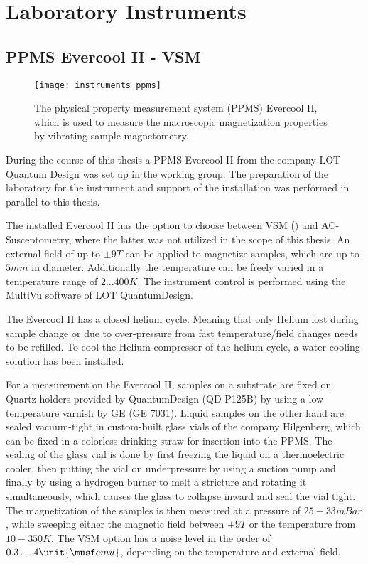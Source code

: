 \documentclass[\main/dresen_thesis.tex]{subfiles}
\begin{document}
\section{Laboratory Instruments}
  \subsection{PPMS Evercool II - VSM}
    \label{ch:instruments:laboratoryInstruments:vsm}
    \begin{figure}[ht]
      \centering
      \texttt{[image: instruments\_ppms]}
      \caption{\label{fig:appendix:instruments:ppms}The physical property measurement system (PPMS) Evercool II, which is used to measure the macroscopic magnetization properties by vibrating sample magnetometry.}
    \end{figure}
    During the course of this thesis a PPMS Evercool II from the company LOT Quantum Design was set up in the working group.
    The preparation of the laboratory for the instrument and support of the installation was performed in parallel to this thesis.

    The installed Evercool II has the option to choose between VSM () and AC-Susceptometry, where the latter was not utilized in the scope of this thesis.
    An external field of up to $\pm 9 \unit{T}$ can be applied to magnetize samples, which are up to $5 \unit{mm}$ in diameter.
    Additionally the temperature can be freely varied in a temperature range of $2 \ldots 400 \unit{K}$.
    The instrument control is performed using the MultiVu software of LOT QuantumDesign.

    The Evercool II has a closed helium cycle.
    Meaning that only Helium lost during sample change or due to over-pressure from fast temperature/field changes needs to be refilled.
    To cool the Helium compressor of the helium cycle, a water-cooling solution has been installed.

    For a measurement on the Evercool II, samples on a substrate are fixed on Quartz holders provided by QuantumDesign (QD-P125B) by using a low temperature varnish by GE (GE 7031).
    Liquid samples on the other hand are sealed vacuum-tight in custom-built glass vials of the company Hilgenberg, which can be fixed in a colorless drinking straw for insertion into the PPMS.
    The sealing of the glass vial is done by first freezing the liquid on a thermoelectric cooler, then putting the vial on underpressure by using a suction pump and finally by using a hydrogen burner to melt a stricture and rotating it simultaneously, which causes the glass to collapse inward and seal the vial tight.
    The magnetization of the samples is then measured at a pressure of $25 - 33 \unit{mBar}$, while sweeping either the magnetic field between $\pm 9 \unit{T}$ or the temperature from $10 - 350 \unit{K}$.
    The VSM option has a noise level in the order of $0.3 \ldots 4 \unit{\musf emu}$, depending on the temperature and external field.
\end{document}
